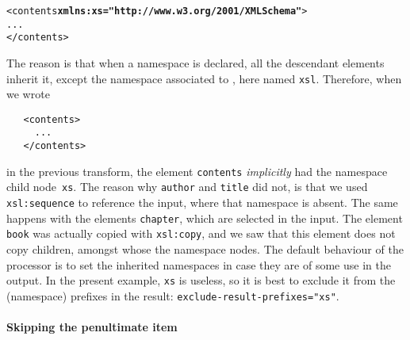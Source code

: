 \begin{alltt}
   <contents \textbf{xmlns:xs="http://www.w3.org/2001/XMLSchema"}>
     ...
   </contents>
\end{alltt}
The reason is that when a namespace is declared, all the descendant
elements inherit it, except the namespace associated to \XSLT, here
named \texttt{xsl}. Therefore, when we wrote
\begin{verbatim}
   <contents>
     ...
   </contents>
\end{verbatim}
in the previous transform, the element \texttt{contents}
\emph{implicitly} had the namespace child node~\texttt{xs}. The reason
why \texttt{author} and \texttt{title} did not, is that we used
\texttt{xsl:sequence} to reference the input, where that namespace is
absent. The same happens with the elements \texttt{chapter}, which are
selected in the input. The element \texttt{book} was actually copied
with \texttt{xsl:copy}, and we saw that this element does not copy
children, amongst whose the namespace nodes. The default behaviour of
the \XSLT processor is to set the inherited namespaces in case they
are of some use in the output. In the present example, \texttt{xs} is
useless, so it is best to exclude it from the (namespace) prefixes in
the result: \texttt{exclude-result-prefixes="xs"}.

\paragraph{Skipping the penultimate item}


